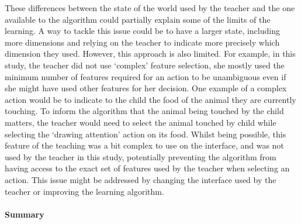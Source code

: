 These differences between the state of the world used by the teacher and the one available to the algorithm could partially explain some of the limits of the learning. A way to tackle this issue could be to have a larger state, including more dimensions and relying on the teacher to indicate more precisely which dimension they used. However, this approach is also limited. For example, in this study, the teacher did not use `complex' feature selection, she mostly used the minimum number of features required for an action to be unambiguous even if she might have used other features for her decision. One example of a complex action would be to indicate to the child the food of the animal they are currently touching. To inform the algorithm that the animal being touched by the child matters, the teacher would need to select the animal touched by child while selecting the `drawing attention' action on its food. Whilst being possible, this feature of the teaching was a bit complex to use on the interface, and was not used by the teacher in this study, potentially preventing the algorithm from having access to the exact set of features used by the teacher when selecting an action. This issue might be addressed by changing the interface used by the teacher or improving the learning algorithm.




\paragraph{Summary}

